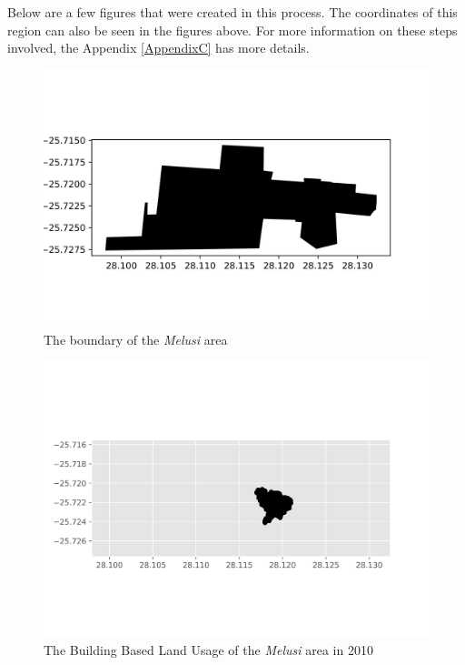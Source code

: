 Below are a few figures that were created in this process. The coordinates of this region can also be seen in the figures above.
For more information on these steps involved, the Appendix \ref{AppendixC} has more details.
\begin{figure}[H]
\centering
\includegraphics[width=1\textwidth]{Figures/Chapter3/MelusiArea}
\caption{The boundary of the \textit{Melusi} area}
\end{figure}
\begin{figure}[H]
\centering
\includegraphics[width=1\textwidth]{Figures/Chapter3/Melusi2010}
\caption{The Building Based Land Usage of the \textit{Melusi} area in 2010}
\label{fig:mel2010}
\end{figure}
